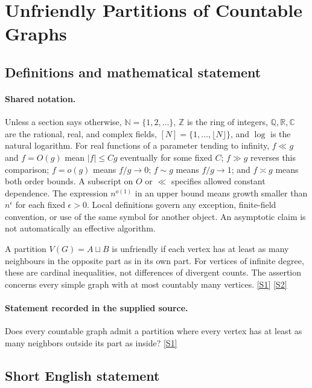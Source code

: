 \documentclass[11pt,a4paper]{article}
\newcommand{\N}{\mathbb{N}}
\newcommand{\Z}{\mathbb{Z}}
\newcommand{\Q}{\mathbb{Q}}
\newcommand{\R}{\mathbb{R}}
\newcommand{\C}{\mathbb{C}}
\newcommand{\sref}[2]{\hyperlink{source:#1:#2}{[S#2]}}
\begin{document}
\section{Unfriendly Partitions of Countable Graphs}\label{statement}


\subsection{Definitions and mathematical statement}

\paragraph{Shared notation.}Unless a section says otherwise, $\N=\{1,2,\ldots\}$,
$\Z$ is the ring of integers, $\Q,\R,\C$ are the rational, real, and complex
fields, $[N]=\{1,\ldots,\lfloor N\rfloor\}$, and $\log$ is the natural
logarithm. For real functions of a parameter tending to infinity,
$f\ll g$ and $f=O(g)$ mean $|f|\leq Cg$ eventually for some fixed $C$;
$f\gg g$ reverses this comparison; $f=o(g)$ means $f/g\to0$;
$f\sim g$ means $f/g\to1$; and $f\asymp g$ means both order bounds.
A subscript on $O$ or $\ll$ specifies allowed constant dependence.
The expression $n^{o(1)}$ in an upper bound means growth smaller than
$n^\epsilon$ for each fixed $\epsilon>0$. Local definitions govern any
exception, finite-field convention, or use of the same symbol for another
object. An asymptotic claim is not automatically an effective algorithm.



A partition $V(G)=A\sqcup B$ is unfriendly if each vertex has at least as many neighbours in the opposite part as in its own part. For vertices of infinite degree, these are cardinal inequalities, not differences of divergent counts. The assertion concerns every simple graph with at most countably many vertices. \sref{statement}{1} \sref{statement}{2}

\paragraph{Statement recorded in the supplied source.}
Does every countable graph admit a partition where every vertex has at least as many neighbors outside its part as inside? \sref{statement}{1}

\subsection{Short English statement}
\end{document}
